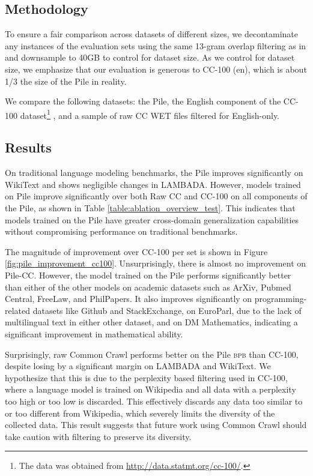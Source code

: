\documentclass[11pt,a4paper]{article}
\begin{document}
\subsection{Methodology}

To ensure a fair comparison across datasets of different sizes, we decontaminate any instances of the evaluation sets using the same 13-gram overlap filtering as in \citet{GPT3} and downsample to 40GB to control for dataset size. As we control for dataset size, we emphasize that our evaluation is generous to CC-100 (en), which is about 1/3 the size of the Pile in reality.  

We compare the following datasets: the Pile, the English component of the CC-100 dataset\footnote{The data was obtained from \url{http://data.statmt.org/cc-100/}.} \citep{wenzek2019ccnet,conneau2019xlmr}, and a sample of raw CC WET files filtered for English-only. 

\subsection{Results}

On traditional language modeling benchmarks, the Pile improves significantly on WikiText and shows negligible changes in LAMBADA. However, models trained on Pile improve significantly over both Raw CC and CC-100 on all components of the Pile, as shown in Table \ref{table:ablation_overview_test}. This indicates that models trained on the Pile have greater cross-domain generalization capabilities without compromising performance on traditional benchmarks.

The magnitude of improvement over CC-100 per set is shown in Figure \ref{fig:pile_improvement_cc100}. Unsurprisingly, there is almost no improvement on Pile-CC. However, the model trained on the Pile performs significantly better than either of the other models on academic datasets such as ArXiv, Pubmed Central, FreeLaw, and PhilPapers. It also improves significantly on programming-related datasets like Github and StackExchange, on EuroParl, due to the lack of multilingual text in either other dataset, and on DM Mathematics, indicating a significant improvement in mathematical ability.

Surprisingly, raw Common Crawl performs better on the Pile \textsc{bpb} than CC-100, despite losing by a significant margin on LAMBADA and WikiText. We hypothesize that this is due to the perplexity based filtering used in CC-100, where a language model is trained on Wikipedia and all data with a perplexity too high or too low is discarded. This effectively discards any data too similar to or too different from Wikipedia, which severely limits the diversity of the collected data. This result suggests that future work using Common Crawl should take caution with filtering to preserve its diversity.
\end{document}
